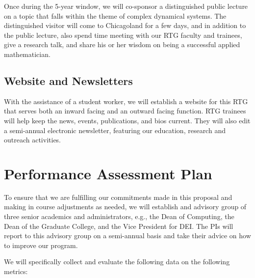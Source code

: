 \documentclass[11pt]{NSFamsart}
\begin{document}
Once during the 5-year window, we will co-sponsor a distinguished public lecture  on a topic that falls within the theme of complex dynamical systems.  The distinguished visitor will come to Chicagoland for a few days, and in addition to the public lecture, also spend time meeting with our RTG faculty and trainees, give a research talk, and share his or her wisdom on being a successful applied mathematician. 

\subsection*{Website and Newsletters} 
With the assistance of a student worker, we will establish a website for this RTG that serves both an inward facing and an outward facing function.  RTG trainees will help keep the news, events, publications, and bios current.  They will also edit a semi-annual electronic newsletter, 
featuring our education, research  and outreach  activities. 



\section{Performance Assessment Plan  }
 
To ensure that we are fulfilling our commitments made in this proposal and making in course adjustments as needed, we will establish and advisory group of three senior academics and administrators, e.g., the Dean of Computing, the Dean of the Graduate College, and the Vice President for DEI.  The PIs will report to this advisory group on a semi-annual basis and take their advice on how to improve our program.

We will specifically collect and evaluate the following data on the following metrics:
\end{document}

